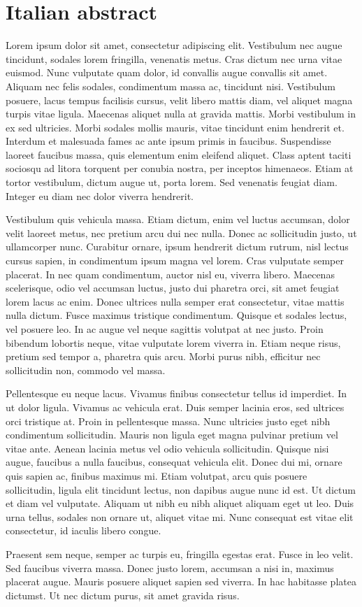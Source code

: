 \chapter*{Italian abstract}

Lorem ipsum dolor sit amet, consectetur adipiscing elit. Vestibulum nec augue tincidunt, sodales lorem fringilla, venenatis metus. Cras dictum nec urna vitae euismod. Nunc vulputate quam dolor, id convallis augue convallis sit amet. Aliquam nec felis sodales, condimentum massa ac, tincidunt nisi. Vestibulum posuere, lacus tempus facilisis cursus, velit libero mattis diam, vel aliquet magna turpis vitae ligula. Maecenas aliquet nulla at gravida mattis. Morbi vestibulum in ex sed ultricies. Morbi sodales mollis mauris, vitae tincidunt enim hendrerit et. Interdum et malesuada fames ac ante ipsum primis in faucibus. Suspendisse laoreet faucibus massa, quis elementum enim eleifend aliquet. Class aptent taciti sociosqu ad litora torquent per conubia nostra, per inceptos himenaeos. Etiam at tortor vestibulum, dictum augue ut, porta lorem. Sed venenatis feugiat diam. Integer eu diam nec dolor viverra hendrerit.

Vestibulum quis vehicula massa. Etiam dictum, enim vel luctus accumsan, dolor velit laoreet metus, nec pretium arcu dui nec nulla. Donec ac sollicitudin justo, ut ullamcorper nunc. Curabitur ornare, ipsum hendrerit dictum rutrum, nisl lectus cursus sapien, in condimentum ipsum magna vel lorem. Cras vulputate semper placerat. In nec quam condimentum, auctor nisl eu, viverra libero. Maecenas scelerisque, odio vel accumsan luctus, justo dui pharetra orci, sit amet feugiat lorem lacus ac enim. Donec ultrices nulla semper erat consectetur, vitae mattis nulla dictum. Fusce maximus tristique condimentum. Quisque et sodales lectus, vel posuere leo. In ac augue vel neque sagittis volutpat at nec justo. Proin bibendum lobortis neque, vitae vulputate lorem viverra in. Etiam neque risus, pretium sed tempor a, pharetra quis arcu. Morbi purus nibh, efficitur nec sollicitudin non, commodo vel massa.

Pellentesque eu neque lacus. Vivamus finibus consectetur tellus id imperdiet. In ut dolor ligula. Vivamus ac vehicula erat. Duis semper lacinia eros, sed ultrices orci tristique at. Proin in pellentesque massa. Nunc ultricies justo eget nibh condimentum sollicitudin. Mauris non ligula eget magna pulvinar pretium vel vitae ante. Aenean lacinia metus vel odio vehicula sollicitudin. Quisque nisi augue, faucibus a nulla faucibus, consequat vehicula elit. Donec dui mi, ornare quis sapien ac, finibus maximus mi. Etiam volutpat, arcu quis posuere sollicitudin, ligula elit tincidunt lectus, non dapibus augue nunc id est. Ut dictum et diam vel vulputate. Aliquam ut nibh eu nibh aliquet aliquam eget ut leo. Duis urna tellus, sodales non ornare ut, aliquet vitae mi. Nunc consequat est vitae elit consectetur, id iaculis libero congue.

Praesent sem neque, semper ac turpis eu, fringilla egestas erat. Fusce in leo velit. Sed faucibus viverra massa. Donec justo lorem, accumsan a nisi in, maximus placerat augue. Mauris posuere aliquet sapien sed viverra. In hac habitasse platea dictumst. Ut nec dictum purus, sit amet gravida risus.
